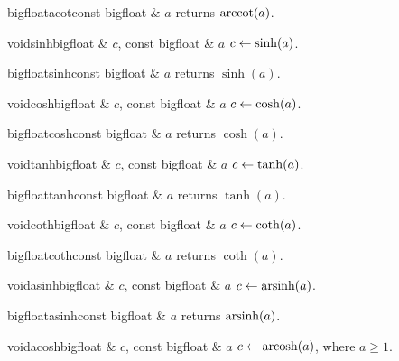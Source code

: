 \begin{fcode}{bigfloat}{acot}{const bigfloat & $a$}
  returns $\operatorname{arccot}(a)$.
\end{fcode}




\begin{fcode}{void}{sinh}{bigfloat & $c$, const bigfloat & $a$}
  $c \leftarrow \sinh(a)$.
\end{fcode}

\begin{fcode}{bigfloat}{sinh}{const bigfloat & $a$}
  returns $\sinh(a)$.
\end{fcode}

\begin{fcode}{void}{cosh}{bigfloat & $c$, const bigfloat & $a$}
  $c \leftarrow \cosh(a)$.
\end{fcode}

\begin{fcode}{bigfloat}{cosh}{const bigfloat & $a$}
  returns $\cosh(a)$.
\end{fcode}

\begin{fcode}{void}{tanh}{bigfloat & $c$, const bigfloat & $a$}
  $c \leftarrow \tanh(a)$.
\end{fcode}

\begin{fcode}{bigfloat}{tanh}{const bigfloat & $a$}
  returns $\tanh(a)$.
\end{fcode}

\begin{fcode}{void}{coth}{bigfloat & $c$, const bigfloat & $a$}
  $c \leftarrow \coth(a)$.
\end{fcode}

\begin{fcode}{bigfloat}{coth}{const bigfloat & $a$}
  returns $\coth(a)$.
\end{fcode}

\begin{fcode}{void}{asinh}{bigfloat & $c$, const bigfloat & $a$}
  $c \leftarrow \operatorname{arsinh}(a)$.
\end{fcode}

\begin{fcode}{bigfloat}{asinh}{const bigfloat & $a$}
  returns $\operatorname{arsinh}(a)$.
\end{fcode}

\begin{fcode}{void}{acosh}{bigfloat & $c$, const bigfloat & $a$}
  $c \leftarrow \operatorname{arcosh}(a)$, where $a \geq 1$.
\end{fcode}

